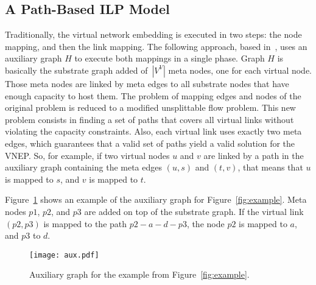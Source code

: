 \documentclass[article]{llncs}
\begin{document}
\subsection{A Path-Based ILP Model}
Traditionally, the virtual network embedding is executed in two steps: the node mapping, and then the link mapping. 
The following approach, based in~\cite{Chowdhury:2012}, uses an auxiliary graph $H$ to execute both mappings in a single phase. 
Graph $H$ is basically the substrate graph added of~$|V^{V}|$ meta nodes, one for each virtual node. 
Those meta nodes are linked by meta edges to all substrate nodes that have enough capacity to host them. 
The problem of mapping edges and nodes of the original problem is reduced to a modified unsplittable flow problem. 
This new problem consists in finding a set of paths that covers all virtual links without violating the capacity constraints. 
Also, each virtual link uses exactly two meta edges, which guarantees that a valid set of paths yield a valid solution for the VNEP.
So, for example, if two virtual nodes $u$ and $v$ are linked by a path in the auxiliary graph containing the meta edges $(u,s)$ and $(t,v)$, that means that $u$ is mapped to $s$, and $v$ is mapped to $t$.

Figure~\ref{fig:aux} shows an example of the auxiliary graph for Figure~\ref{fig:example}.
Meta nodes $p1$, $p2$, and $p3$ are added on top of the substrate graph. If the virtual link $(p2, p3)$ is mapped to the path $p2-a-d-p3$, the node $p2$ is mapped to $a$, and $p3$ to $d$.

\begin{figure}[h!]
  \centering
  \texttt{[image: aux.pdf]}
  \caption{Auxiliary graph for the example from Figure~\ref{fig:example}.\label{fig:aux}}
\end{figure}
\end{document}
